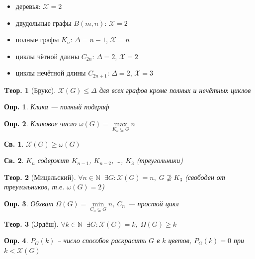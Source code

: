 \documentclass[a4paper,12pt]{article}
\newtheorem{definition}{Опр.}[section]
\newtheorem{property}{Св.}[definition]
\newtheorem{theorem}{Tеор.}[section]
\def\iiChi{\mathcal{X}}
\begin{document}
\begin{itemize}
  \item  деревья:  $\iiChi=2$
  \item  двудольные графы $B(m,n)$: $\iiChi=2$
  \item  полные графы $K_n$:        $\Delta=n-1$, $\iiChi=n$
  \item  циклы чётной длины $C_{2n}$:     $\Delta=2$, $\iiChi=2$
  \item  циклы нечётной длины $C_{2n+1}$: $\Delta=2$, $\iiChi=3$
\end{itemize}

\begin{theorem}[Брукс]
	$\iiChi(G) \leqslant \Delta$ для всех графов кроме полных и нечётных циклов
\end{theorem}

\begin{definition} Клика --- полный подграф \end{definition}

\begin{definition}
	Кликовое число $ \omega(G) = \max \limits_{K_n \subseteq G} n $
\end{definition}

\begin{property} $ \iiChi(G) \geqslant \omega(G) $ \end{property}

\begin{property} $K_n$ содержит $K_{n-1}$, $K_{n-2}$, \dots, $K_3$ (треугольники) \end{property}

\begin{theorem}[Мицельский]
	$\forall n \in \mathbb{N} \;\; \exists G: \iiChi(G)=n, \; G \nsupseteq K_3$
	(свободен от треугольников, т.е. $\omega(G)=2$)
\end{theorem}

\begin{definition}
	Обхват $\Omega(G) = \min \limits_{C_n \subseteq G} n $, $C_n$ --- простой цикл
\end{definition}

\begin{theorem}[Эрдёш]
	$\forall k \in \mathbb{N} \;\; \exists G: \iiChi(G)=k, \; \Omega(G) \geqslant k$
\end{theorem}

\begin{definition}
	$P_G(k)$ -- число способов раскрасить $G$ в $k$ цветов, $P_G(k)=0$ при $k<\iiChi(G)$
\end{definition}
\end{document}
